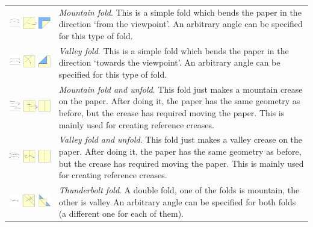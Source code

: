 \begin{savenotes}
\begin{longtable}{lp{5.5cm}}
\includegraphics[width=7.5cm]{images/folds_mountain} & \emph{Mountain fold}. This is a simple fold which bends the paper in the direction `from the viewpoint'. An arbitrary angle can be specified for this type of fold.\\
\includegraphics[width=7.5cm]{images/folds_valley} & \emph{Valley fold}. This is a simple fold which bends the paper in the direction `towards the viewpoint'. An arbitrary angle can be specified for this type of fold.\\
\includegraphics[width=7.5cm]{images/folds_fold_unfold_mountain} & \emph{Mountain fold and unfold}. This fold just makes a mountain crease on the paper. After doing it, the paper has the same geometry as before, but the crease has required moving the paper. This is mainly used for creating reference creases.\\
\includegraphics[width=7.5cm]{images/folds_fold_unfold_valley} & \emph{Valley fold and unfold}. This fold just makes a valley crease on the paper. After doing it, the paper has the same geometry as before, but the crease has required moving the paper. This is mainly used for creating reference creases.\\
\includegraphics[width=7.5cm]{images/folds_thunderbolt} & \emph{Thunderbolt fold}. A double fold, one of the folds is mountain, the other is valley An arbitrary angle can be specified for both folds (a different one for each of them).\\

\end{longtable}
\end{savenotes}
